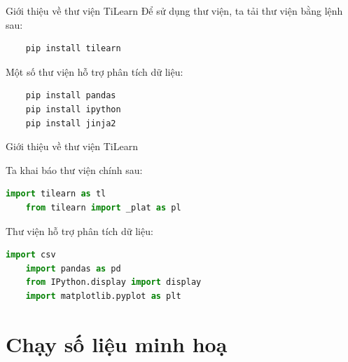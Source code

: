 \documentclass[10pt]{beamer}
\begin{document}
\begin{frame}[fragile]{Giới thiệu về thư viện TiLearn}
Để sử dụng thư viện, ta tải thư viện bằng lệnh sau:
\medskip
\begin{lstlisting}
    pip install tilearn
\end{lstlisting}
\medskip
Một số thư viện hỗ trợ phân tích dữ liệu:
\begin{lstlisting}
    pip install pandas
    pip install ipython
    pip install jinja2
\end{lstlisting}

\end{frame}

\begin{frame}[fragile]{Giới thiệu về thư viện TiLearn}

Ta khai báo thư viện chính sau:
\medskip
\begin{lstlisting}[language=Python]
    import tilearn as tl
    from tilearn import _plat as pl
\end{lstlisting}

Thư viện hỗ trợ phân tích dữ liệu:
\medskip
\begin{lstlisting}[language=Python]
    import csv
    import pandas as pd
    from IPython.display import display
    import matplotlib.pyplot as plt
\end{lstlisting}

\end{frame}


\section{Chạy số liệu minh hoạ}
\end{document}

